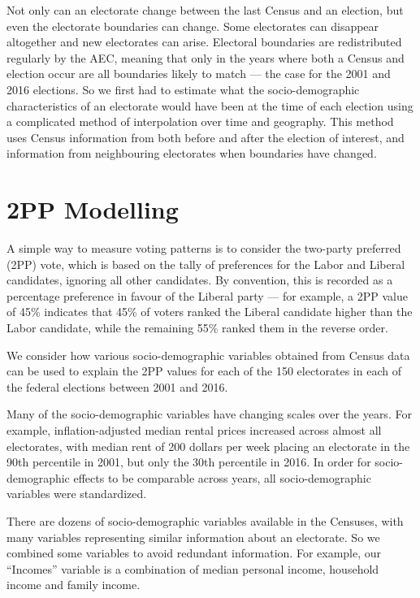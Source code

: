\documentclass[11pt,a4paper,]{article}
\begin{document}
Not only can an electorate change between the last Census and an election, but even the electorate boundaries can change. Some electorates can disappear altogether and new electorates can arise. Electoral boundaries are redistributed regularly by the AEC, meaning that only in the years where both a Census and election occur are all boundaries likely to match --- the case for the 2001 and 2016 elections. So we first had to estimate what the socio-demographic characteristics of an electorate would have been at the time of each election using a complicated method of interpolation over time and geography. This method uses Census information from both before and after the election of interest, and information from neighbouring electorates when boundaries have changed.

\hypertarget{modelling}{%
\section{2PP Modelling}\label{modelling}}

A simple way to measure voting patterns is to consider the two-party preferred (2PP) vote, which is based on the tally of preferences for the Labor and Liberal candidates, ignoring all other candidates. By convention, this is recorded as a percentage preference in favour of the Liberal party --- for example, a 2PP value of 45\% indicates that 45\% of voters ranked the Liberal candidate higher than the Labor candidate, while the remaining 55\% ranked them in the reverse order.

We consider how various socio-demographic variables obtained from Census data can be used to explain the 2PP values for each of the 150 electorates in each of the federal elections between 2001 and 2016.

Many of the socio-demographic variables have changing scales over the years. For example, inflation-adjusted median rental prices increased across almost all electorates, with median rent of 200 dollars per week placing an electorate in the 90th percentile in 2001, but only the 30th percentile in 2016. In order for socio-demographic effects to be comparable across years, all socio-demographic variables were standardized.

There are dozens of socio-demographic variables available in the Censuses, with many variables representing similar information about an electorate. So we combined some variables to avoid redundant information. For example, our ``Incomes'' variable is a combination of median personal income, household income and family income.
\end{document}
